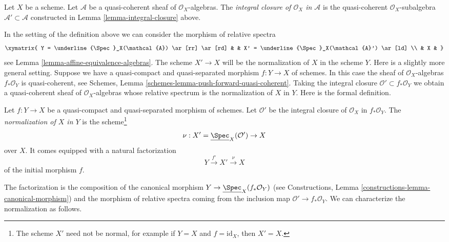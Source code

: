 \begin{definition}
\label{definition-integral-closure}
Let $X$ be a scheme. Let $\mathcal{A}$ be a quasi-coherent sheaf
of $\mathcal{O}_X$-algebras. The {\it integral closure of $\mathcal{O}_X$
in $\mathcal{A}$} is the quasi-coherent $\mathcal{O}_X$-subalgebra
$\mathcal{A}' \subset \mathcal{A}$ constructed in
Lemma \ref{lemma-integral-closure} above.
\end{definition}

\noindent
In the setting of the definition above we can consider the morphism
of relative spectra
$$
\xymatrix{
Y = \underline{\Spec}_X(\mathcal{A}) \ar[rr] \ar[rd] & &
X' = \underline{\Spec}_X(\mathcal{A}') \ar[ld] \\
& X &
}
$$
see Lemma \ref{lemma-affine-equivalence-algebras}.
The scheme $X' \to X$ will be the normalization of $X$ in the scheme $Y$.
Here is a slightly more general setting. Suppose we have a
quasi-compact and quasi-separated morphism $f : Y \to X$
of schemes. In this case the sheaf of
$\mathcal{O}_X$-algebras $f_*\mathcal{O}_Y$ is quasi-coherent, see
Schemes, Lemma \ref{schemes-lemma-push-forward-quasi-coherent}.
Taking the integral closure $\mathcal{O}' \subset f_*\mathcal{O}_Y$
we obtain a quasi-coherent sheaf of $\mathcal{O}_X$-algebras
whose relative spectrum is the normalization of $X$ in $Y$. Here is
the formal definition.

\begin{definition}
\label{definition-normalization-X-in-Y}
Let $f : Y \to X$ be a quasi-compact and quasi-separated morphism of schemes.
Let $\mathcal{O}'$ be the integral closure of $\mathcal{O}_X$ in
$f_*\mathcal{O}_Y$. The {\it normalization of $X$ in $Y$} is the
scheme\footnote{The scheme $X'$ need not be normal, for example if
$Y = X$ and $f = \text{id}_X$, then $X' = X$.}
$$
\nu : X' = \underline{\Spec}_X(\mathcal{O}') \to X
$$
over $X$. It comes equipped with a natural factorization
$$
Y \xrightarrow{f'} X' \xrightarrow{\nu} X
$$
of the initial morphism $f$.
\end{definition}

\noindent
The factorization is the composition of the canonical morphism
$Y \to \underline{\Spec}_X(f_*\mathcal{O}_Y)$ (see
Constructions, Lemma
\ref{constructions-lemma-canonical-morphism})
and the morphism of relative spectra coming from the inclusion map
$\mathcal{O}' \to f_*\mathcal{O}_Y$. We can characterize the
normalization as follows.


